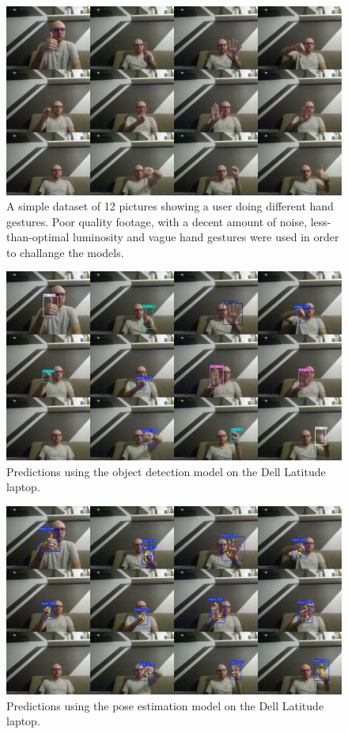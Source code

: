 \documentclass[12pt]{article}
\begin{document}
\begin{figure}[H]
  \centering
  \includegraphics[width=\textwidth]{./pictures/pred_test.jpg}
  \caption{A simple dataset of 12 pictures showing a user doing different hand gestures. Poor quality footage, with a decent amount of noise, less-than-optimal luminosity and vague hand gestures were used in order to challange the models.}
  \label{fig:predtest}
\end{figure}

\begin{figure}[H]
  \centering
  \includegraphics[width=\textwidth]{./pictures/smallhands_dell.jpg}
  \caption{ Predictions using the object detection model on the Dell Latitude laptop.}
  \label{fig:objdell}
\end{figure}

\begin{figure}[H]
  \centering
  \includegraphics[width=\textwidth]{./pictures/pose_dell.jpg}
  \caption{Predictions using the pose estimation model on the Dell Latitude laptop.}
  \label{fig:posedell}
\end{figure}
\end{document}
